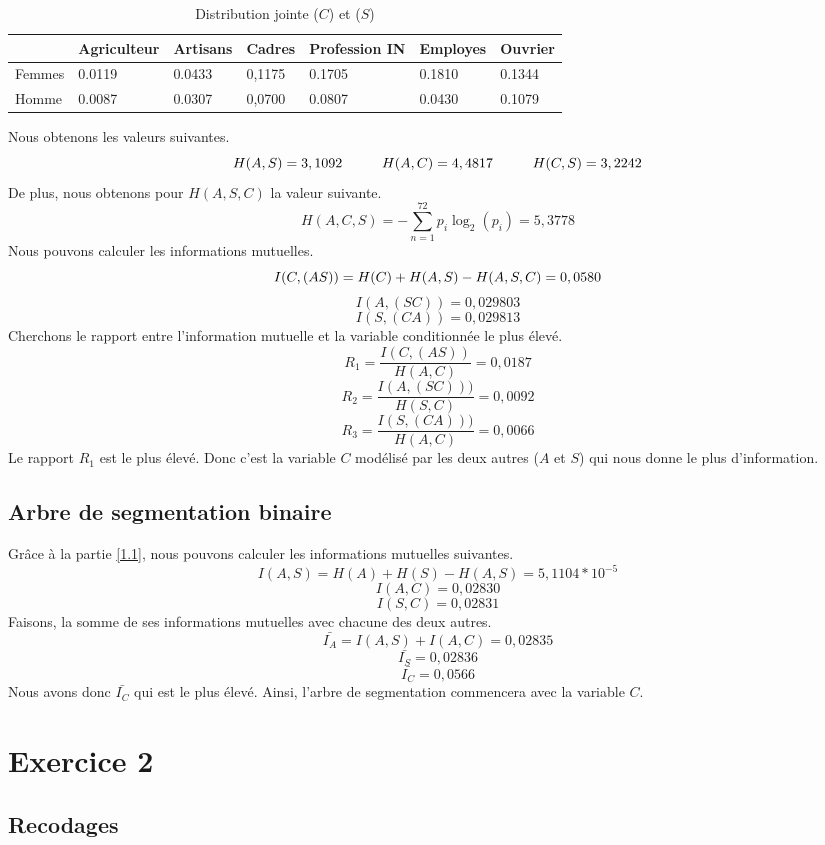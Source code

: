 \documentclass{article}
\begin{document}
\begin{table}[H]
  \centering
  \begin{tabular}{|l|l|l|l|l|l|l|}
  \hline
         & Agriculteur & Artisans & Cadres & Profession IN & Employes & Ouvrier \\ \hline
    Femmes & 0.0119      & 0.0433   & 0,1175 & 0.1705        & 0.1810   & 0.1344  \\ \hline
    Homme  & 0.0087      & 0.0307   & 0,0700 & 0.0807        & 0.0430   & 0.1079  \\ \hline
    \end{tabular}
    \caption{Distribution jointe ($C$) et ($S$)}
\end{table}
Nous obtenons les valeurs suivantes.
\[
H(A,S)=3,1092 \hspace{1 cm} H(A,C)= 4,4817 \hspace{1cm} H(C,S)=3,2242
\]
De plus, nous obtenons pour $H(A,S,C)$ la valeur suivante.
\[
  H(A,C,S) = -\sum_{n = 1}^{72}p_i\log_2(p_i)=5,3778
\]
Nous pouvons calculer les informations mutuelles.
\[
I(C,(AS))=H(C)+H(A,S)-H(A,S,C) = 0,0580 \\
\]
\[
I(A,(SC))= 0,029803
\]
\[
I(S,(CA))=0,029813
\]
Cherchons le rapport entre l'information mutuelle et la variable conditionnée le plus élevé.
\[
R_1 = \frac{I(C,(AS))}{H(A,C)}=0,0187
\]
\[
R_2 = \frac{I(A,(SC)))}{H(S,C)}=0,0092
\]
\[
R_3 = \frac{I(S,(CA)))}{H(A,C)}=0,0066
\]
Le rapport $R_1$ est le plus élevé. Donc c'est la variable $C$ modélisé par les deux autres ($A$ et $S$) qui nous donne le plus d'information.
\subsection{Arbre de segmentation binaire}
Grâce à la partie \ref{1.1}, nous pouvons calculer les informations mutuelles suivantes.
\[
I(A,S) = H(A) + H(S) - H(A,S) = 5,1104*10^{-5}
\]
\[
I(A,C) = 0,02830
\]
\[
I(S,C)= 0,02831
\]
Faisons, la somme de ses informations mutuelles avec chacune des deux autres.
\[
\bar{I_A} = I(A,S) + I(A,C) = 0,02835
\]
\[
\bar{I_S}= 0,02836 
\]
\[
\bar{I_C} = 0,0566
\]
Nous avons donc $\bar{I_C}$ qui est le plus élevé. Ainsi, l'arbre de segmentation commencera avec la variable $C$.






\newpage
\section{Exercice 2}
\subsection{Recodages}
\end{document}
